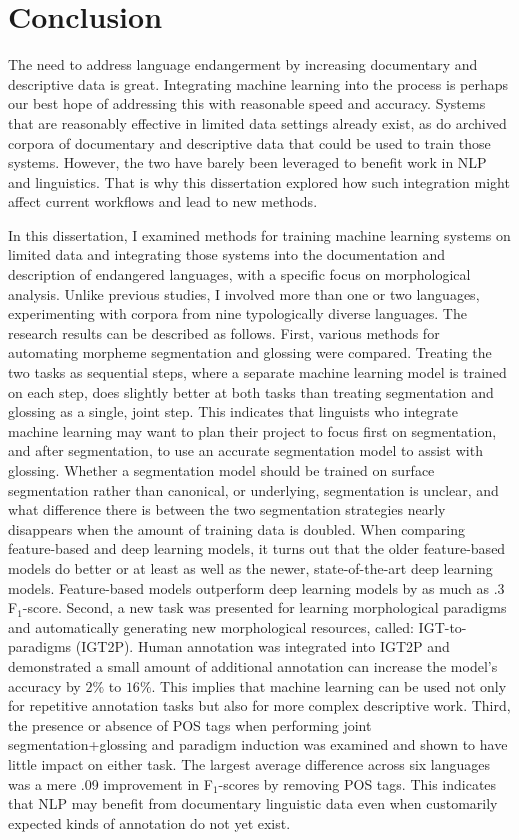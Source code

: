\chapter{Conclusion}
\label{chap:conclusion}

The need to address language endangerment by increasing documentary and descriptive data is great. Integrating machine learning into the process is perhaps our best hope of addressing this with reasonable speed and accuracy. Systems that are reasonably effective in limited data settings already exist, as do archived corpora of documentary and descriptive data that could be used to train those systems. However, the two have barely been leveraged to benefit work in NLP and linguistics. That is why this dissertation explored how such integration might affect current workflows and lead to new methods. 

In this dissertation, I examined methods for training machine learning systems on limited data and integrating those systems into the documentation and description of endangered languages, with a specific focus on morphological analysis. Unlike previous studies, I involved more than one or two languages, experimenting with corpora from nine typologically diverse languages. The research results can be described as follows. First, various methods for automating morpheme segmentation and glossing were compared. Treating the two tasks as sequential steps, where a separate machine learning model is trained on each step, does slightly better at both tasks than treating segmentation and glossing as a single, joint step. This indicates that linguists who integrate machine learning may want to plan their project to focus first on segmentation, and after segmentation, to use an accurate segmentation model to assist with glossing. 
Whether a segmentation model should be trained on surface segmentation rather than canonical, or underlying, segmentation is unclear, and what difference there is between the two segmentation strategies nearly disappears when the amount of training data is doubled. 
When comparing feature-based and deep learning  models, it turns out that the older feature-based models do better or at least as well as the newer, state-of-the-art deep learning models. Feature-based models outperform deep learning models by as much as .3 F$_1$-score.
Second, a new task was presented for learning morphological paradigms and automatically generating new morphological resources, called: IGT-to-paradigms (IGT2P). Human annotation was integrated into IGT2P and demonstrated a small amount of additional annotation can increase the model's accuracy by $2\%$ to $16\%$. This implies that machine learning can be used not only for repetitive annotation tasks but also for more complex descriptive work. 
Third, the presence or absence of POS tags when performing joint segmentation+glossing and paradigm induction was examined and shown to have little impact on either task. The largest average difference across six languages was a mere .09 improvement in F$_1$-scores by removing POS tags. This indicates that NLP may benefit from documentary linguistic data even when customarily expected kinds of annotation do not yet exist.

